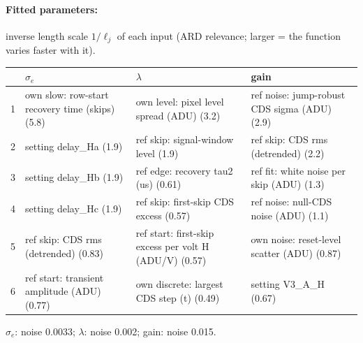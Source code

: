 \paragraph{Fitted parameters:} inverse length scale $1/\ell_j$ of each input (ARD relevance; larger = the function varies faster with it).
\begin{center}\footnotesize
\begin{tabular}{rp{}p{}p{}}
\toprule
 & $\sigma_e$ & $\lambda$ & gain \\
\midrule
1 & own slow: row-start recovery time (skips) (5.8) & own level: pixel level spread (ADU) (3.2) & ref noise: jump-robust CDS sigma (ADU) (2.9) \\
2 & setting delay\_Ha (1.9) & ref skip: signal-window level (1.9) & ref skip: CDS rms (detrended) (2.2) \\
3 & setting delay\_Hb (1.9) & ref edge: recovery tau2 (us) (0.61) & ref fit: white noise per skip (ADU) (1.3) \\
4 & setting delay\_Hc (1.9) & ref skip: first-skip CDS excess (0.57) & ref noise: null-CDS noise (ADU) (1.1) \\
5 & ref skip: CDS rms (detrended) (0.83) & ref start: first-skip excess per volt H (ADU/V) (0.57) & own noise: reset-level scatter (ADU) (0.87) \\
6 & ref start: transient amplitude (ADU) (0.77) & own discrete: largest CDS step (t) (0.49) & setting V3\_A\_H (0.67) \\
\bottomrule
\end{tabular}
\end{center}
{\footnotesize $\sigma_e$: noise 0.0033; $\lambda$: noise 0.002; gain: noise 0.015.}
